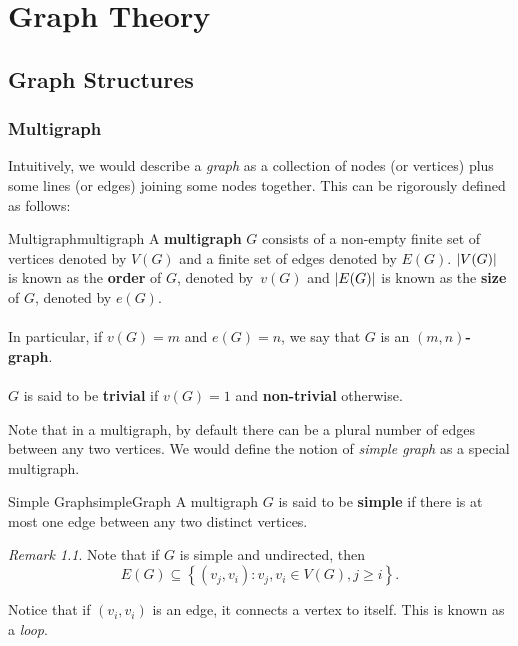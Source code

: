 \documentclass[math]{amznotes}
\theoremstyle{remark}
\newtheorem*{remark}{Remark}
\begin{document}
\chapter{Graph Theory}
\section{Graph Structures}
\subsection{Multigraph}
Intuitively, we would describe a \textit{graph} as a collection of nodes (or vertices) plus some lines (or edges) joining some nodes together. This can be rigorously defined as follows:
\begin{dfnbox}{Multigraph}{multigraph}
    A {\color{red} \textbf{multigraph}} $G$ consists of a non-empty finite set of vertices denoted by $V(G)$ and a finite set of edges denoted by $E(G)$. ${\left\lvert {V(G)} \right\rvert}$ is known as the {\color{red} \textbf{order}} of $G$, denoted by~$v(G)$ and ${\left\lvert {E(G)} \right\rvert}$ is known as the {\color{red} \textbf{size}} of $G$, denoted by $e(G)$.
    \\\\
    In particular, if $v(G) = m$ and $e(G) = n$, we say that $G$ is an {\color{red} \textbf{$(m, n)$-graph}}.
    \\\\
    $G$ is said to be {\color{red} \textbf{trivial}} if $v(G) = 1$ and {\color{red} \textbf{non-trivial}} otherwise.
\end{dfnbox}
Note that in a multigraph, by default there can be a plural number of edges between any two vertices. We would define the notion of \textit{simple graph} as a special multigraph.
\begin{dfnbox}{Simple Graph}{simpleGraph}
    A multigraph $G$ is said to be {\color{red} \textbf{simple}} if there is at most one edge between any two distinct vertices.
\end{dfnbox}
\begin{notebox}
    \begin{remark}
        Note that if $G$ is simple and undirected, then
        \begin{displaymath}
            E(G) \subseteq \left\{(v_j, v_i) \colon v_j, v_i \in V(G), j \geq i\right\}.
        \end{displaymath}
    \end{remark}
\end{notebox}
Notice that if $(v_i, v_i)$ is an edge, it connects a vertex to itself. This is known as a \textit{loop}.
\end{document}
